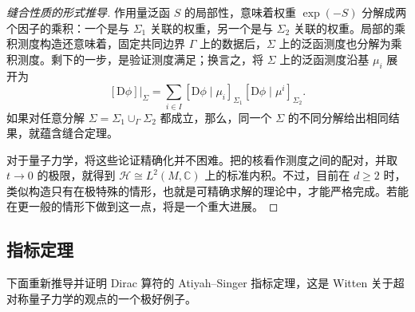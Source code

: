 \begin{proof}[缝合性质的形式推导]
作用量泛函 $S$ 的局部性，意味着权重 $\exp(-S)$ 分解成两个因子的乘积：一个是与 $\Sigma_1$ 关联的权重，另一个是与 $\Sigma_2$ 关联的权重。局部的乘积测度构造还意味着，固定共同边界 $\Gamma$ 上的数据后，$\Sigma$ 上的泛函测度也分解为乘积测度。剩下的一步，是验证测度满足；换言之，将 $\Sigma$ 上的泛函测度沿基 $\mu_i$ 展开为
\[
[\mathrm{D}\phi]|_\Sigma
=\sum_{i\in I}[\mathrm{D}\phi\mid\mu_i]_{\Sigma_1}
[\mathrm{D}\phi\mid\mu^i]_{\Sigma_2}.
\]
如果对任意分解 $\Sigma=\Sigma_1\cup_\Gamma\Sigma_2$ 都成立，那么，同一个 $\Sigma$ 的不同分解给出相同结果，就蕴含缝合定理。

对于量子力学，将这些论证精确化并不困难。把的核看作测度之间的配对，并取 $t\to0$ 的极限，就得到 $\mathcal{H}\cong L^2(M,\mathbb{C})$ 上的标准内积。不过，目前在 $d\ge2$ 时，类似构造只有在极特殊的情形，也就是可精确求解的理论中，才能严格完成。若能在更一般的情形下做到这一点，将是一个重大进展。
\end{proof}

\subsection{指标定理}\label{sec:3.1.3}

下面重新推导并证明 Dirac 算符的 Atiyah--Singer 指标定理，这是 Witten 关于超对称量子力学的观点的一个极好例子。

